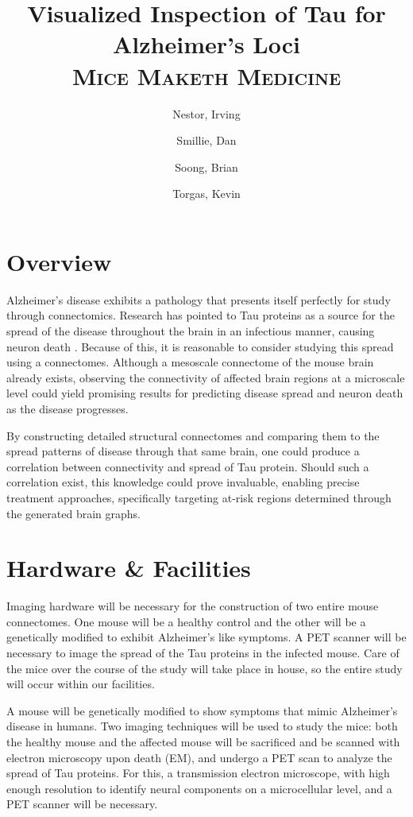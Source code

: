 \documentclass[11pt]{article}
\title{Visualized Inspection of Tau for Alzheimer's Loci \\{\Large \textsc{Mice Maketh Medicine}}}
\author{
  Nestor, Irving
  \and
  Smillie, Dan
  \and
  Soong, Brian
  \and
  Torgas, Kevin
  \and
}
\begin{document}
\maketitle

\section{Overview}

Alzheimer's disease exhibits a pathology that presents itself perfectly for study through connectomics. Research has pointed to Tau proteins as a source for the spread of the disease throughout the brain in an infectious manner, causing neuron death \cite{sciencemag}. Because of this, it is reasonable to consider studying this spread using a connectomes. Although a mesoscale connectome of the mouse brain already exists, observing the connectivity of affected brain regions at a microscale level could yield promising results for predicting disease spread and neuron death as the disease progresses. 

By constructing detailed structural connectomes and comparing them to the spread patterns of disease through that same brain, one could produce a correlation between connectivity and spread of Tau protein. Should such a correlation exist, this knowledge could prove invaluable, enabling precise treatment approaches, specifically targeting at-risk regions determined through the generated brain graphs.

\section{Hardware \& Facilities}

Imaging hardware will be necessary for the construction of two entire mouse connectomes. One mouse will be a healthy control and the other will be a genetically modified to exhibit Alzheimer's like symptoms. A PET scanner will be necessary to image the spread of the Tau proteins in the infected mouse. Care of the mice over the course of the study will take place in house, so the entire study will occur within our facilities. 

A mouse will be genetically modified to show symptoms that mimic Alzheimer's disease in humans. Two imaging techniques will be used to study the mice: both the healthy mouse and the affected mouse will be sacrificed and be scanned with electron microscopy upon death (EM), and undergo a PET scan to analyze the spread of Tau proteins. For this, a transmission electron microscope, with high enough resolution to identify neural components on a microcellular level,  and a PET scanner will be necessary. 
\end{document}
